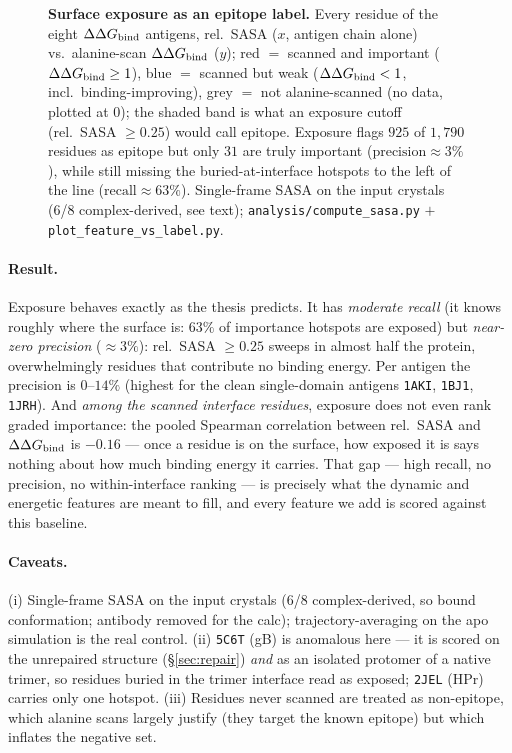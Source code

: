\begin{figure}[H]\centering
{}
\caption{\textbf{Surface exposure as an epitope label.} Every residue of the eight $\Delta\Delta G_{\mathrm{bind}}$ antigens,
rel.\ SASA ($x$, antigen chain alone) vs.\ alanine-scan $\Delta\Delta G_{\mathrm{bind}}$ ($y$); red $=$ scanned and important ($\Delta\Delta G_{\mathrm{bind}}\geq 1$),
blue $=$ scanned but weak ($\Delta\Delta G_{\mathrm{bind}}<1$, incl.\ binding-improving), grey $=$ not alanine-scanned (no
data, plotted at $0$); the shaded band is what an exposure cutoff (rel.\ SASA $\geq 0.25$) would call epitope.
Exposure flags $925$ of $1{,}790$ residues as epitope but only $31$ are truly important
($\mathrm{precision}\approx 3\%$), while still missing the buried-at-interface hotspots to the left of
the line ($\mathrm{recall}\approx 63\%$). Single-frame SASA on the input crystals (6/8 complex-derived,
see text); \texttt{analysis/compute\_sasa.py} $+$ \texttt{plot\_feature\_vs\_label.py}.}\label{fig:sasa-baseline}
\end{figure}

\paragraph{Result.} Exposure behaves exactly as the thesis predicts. It has \emph{moderate recall}
(it knows roughly where the surface is: $63\%$ of importance hotspots are exposed) but
\emph{near-zero precision} ($\approx 3\%$): rel.\ SASA $\geq 0.25$ sweeps in almost half the protein,
overwhelmingly residues that contribute no binding energy. Per antigen the precision is $0$--$14\%$
(highest for the clean single-domain antigens \texttt{1AKI}, \texttt{1BJ1}, \texttt{1JRH}). And
\emph{among the scanned interface residues}, exposure does not even rank graded importance: the
pooled Spearman correlation between rel.\ SASA and $\Delta\Delta G_{\mathrm{bind}}$ is $-0.16$ --- once a residue is on the
surface, how exposed it is says nothing about how much binding energy it carries. That gap ---
high recall, no precision, no within-interface ranking --- is precisely what the dynamic and
energetic features are meant to fill, and every feature we add is scored against this baseline.

\paragraph{Caveats.} (i) Single-frame SASA on the input crystals (6/8 complex-derived, so bound
conformation; antibody removed for the calc); trajectory-averaging on the apo simulation is the real
control. (ii) \texttt{5C6T} (gB) is anomalous here --- it is scored on the unrepaired structure
(\S\ref{sec:repair}) \emph{and} as an isolated protomer of a native trimer, so residues buried in the
trimer interface read as exposed; \texttt{2JEL} (HPr) carries only one hotspot. (iii) Residues never
scanned are treated as non-epitope, which alanine scans largely justify (they target the known
epitope) but which inflates the negative set.

